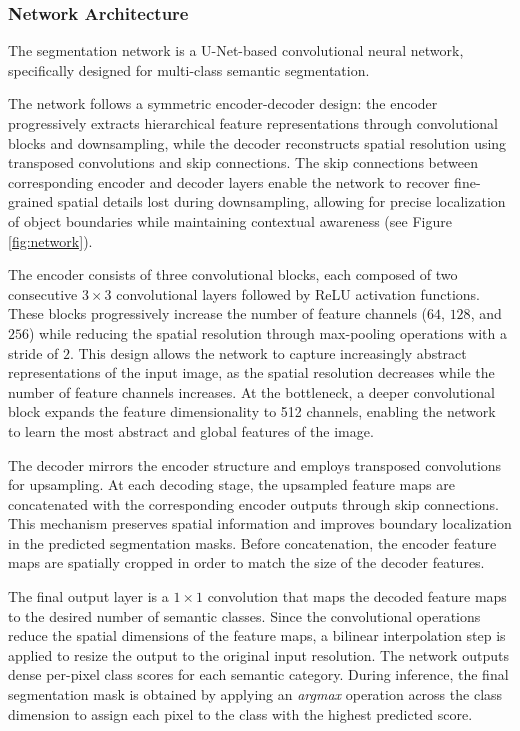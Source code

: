 \documentclass[12pt,a4paper]{report}
\begin{document}
\subsubsection{Network Architecture}
The segmentation network is a U-Net-based convolutional neural network, specifically designed for multi-class semantic segmentation. 

The network follows a symmetric encoder-decoder design: the encoder progressively extracts hierarchical feature representations through convolutional blocks and downsampling, while the decoder reconstructs spatial resolution using transposed convolutions and skip connections. The skip connections between corresponding encoder and decoder layers enable the network to recover fine-grained spatial details lost during downsampling, allowing for precise localization of object boundaries while maintaining contextual awareness (see Figure \ref{fig:network}).

The encoder consists of three convolutional blocks, each composed of two consecutive $3 \times 3$ convolutional layers followed by ReLU activation functions. These blocks progressively increase the number of feature channels ($64$, $128$, and $256$) while reducing the spatial resolution through max-pooling operations with a stride of $2$. This design allows the network to capture increasingly abstract representations of the input image, as the spatial resolution decreases while the number of feature channels increases. At the bottleneck, a deeper convolutional block expands the feature dimensionality to 512 channels, enabling the network to learn the most abstract and global features of the image.

The decoder mirrors the encoder structure and employs transposed convolutions for upsampling. At each decoding stage, the upsampled feature maps are concatenated with the corresponding encoder outputs through skip connections. This mechanism preserves spatial information and improves boundary localization in the predicted segmentation masks. Before concatenation, the encoder feature maps are spatially cropped in order to match the size of the decoder features.

The final output layer is a $1\times1$ convolution that maps the decoded feature maps to the desired number of semantic classes. Since the convolutional operations reduce the spatial dimensions of the feature maps, a bilinear interpolation step is applied to resize the output to the original input resolution. The network outputs dense per-pixel class scores for each semantic category. During inference, the final segmentation mask is obtained by applying an \textit{argmax} operation across the class dimension to assign each pixel to the class with the highest predicted score.
\end{document}
